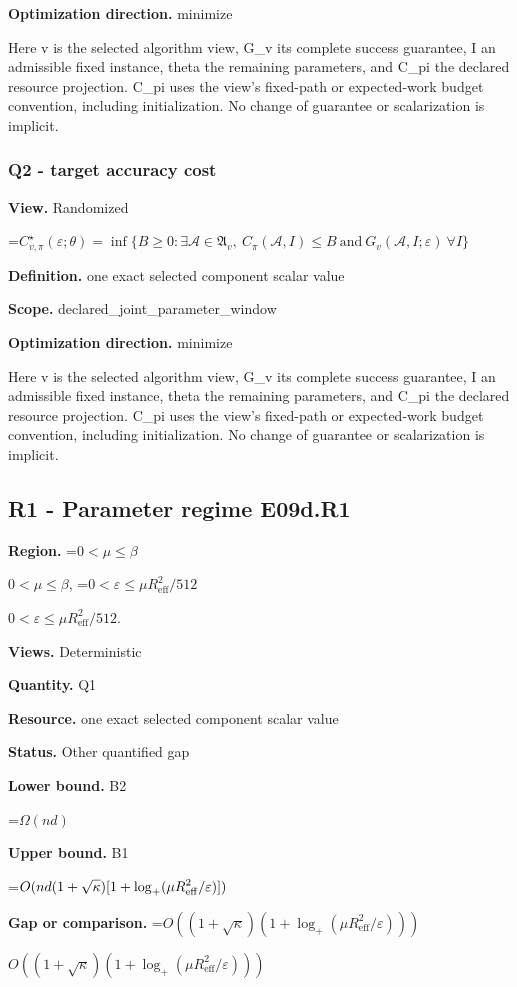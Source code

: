 \documentclass[10pt,a4paper]{article}
\newcommand{\AtlasMath}[1]{\par\begingroup\centering\setbox0=\hbox{$\displaystyle #1$}\ifdim\wd0>1.4\linewidth\typeout{ATLAS WIDE FORMULA: \the\wd0}\fi\ifdim\wd0>\linewidth\resizebox{\linewidth}{!}{\box0}\else\box0\fi\par\endgroup}
\newcommand{\AtlasInlineMath}[1]{\begingroup\setbox0=\hbox{$#1$}\ifdim\wd0>.4\linewidth\endgroup\AtlasMath{#1}\else\endgroup$#1$\fi}
\begin{document}
\textbf{Optimization direction.} minimize

Here v is the selected algorithm view, G\_v its complete success guarantee, I an admissible fixed instance, theta the remaining parameters, and C\_pi the declared resource projection. C\_pi uses the view's fixed-path or expected-work budget convention, including initialization. No change of guarantee or scalarization is implicit.

\subsubsection{Q2 - target accuracy cost}
\textbf{View.} Randomized

\AtlasMath{C^\star_{v,\pi}(\varepsilon;\theta)=\inf\{B\ge0:\exists\mathcal A\in\mathfrak A_v,\ C_\pi(\mathcal A,I)\le B\ \text{and}\ G_v(\mathcal A,I;\varepsilon)\ \forall I\}}
\textbf{Definition.} one exact selected component scalar value

\textbf{Scope.} declared\_joint\_parameter\_window

\textbf{Optimization direction.} minimize

Here v is the selected algorithm view, G\_v its complete success guarantee, I an admissible fixed instance, theta the remaining parameters, and C\_pi the declared resource projection. C\_pi uses the view's fixed-path or expected-work budget convention, including initialization. No change of guarantee or scalarization is implicit.

\subsection{R1 - Parameter regime E09d.R1}
\textbf{Region.} \AtlasInlineMath{0<\mu\le\beta}, \AtlasInlineMath{0<\varepsilon\le\mu R_{\mathrm{eff}}^2/512}.

\textbf{Views.} Deterministic

\textbf{Quantity.} Q1

\textbf{Resource.} one exact selected component scalar value

\textbf{Status.} Other quantified gap

\textbf{Lower bound.} B2

\AtlasMath{\Omega(nd)}
\textbf{Upper bound.} B1

\AtlasMath{O(nd(1+\sqrt\kappa)[1+\log_+(\mu R_{\rm eff}^2/\varepsilon)])}
\textbf{Gap or comparison.} \AtlasInlineMath{O((1+\sqrt{\kappa})(1+\log_+(\mu R_{\mathrm{eff}}^2/\varepsilon)))}
\end{document}
